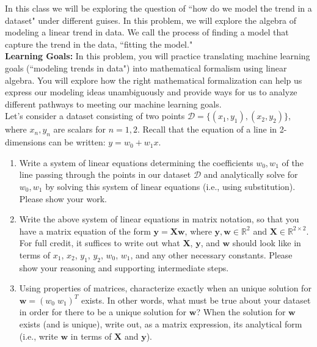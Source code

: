 \documentclass{harvardml}
\theoremstyle{definition}
\theoremstyle{plain}
\begin{document}
\newpage
\begin{problem}
In this class we will be exploring the question of ``how do we model the trend in a dataset" under different guises. In this problem, we will explore the algebra of modeling a linear trend in data. We call the process of finding a model that capture the trend in the data, ``fitting the model."\\

\noindent \textbf{Learning Goals:} In this problem, you will practice translating machine learning goals (``modeling trends in data") into mathematical formalism using linear algebra. You will explore how the right mathematical formalization can help us express our modeling ideas unambiguously and provide ways for us to analyze different pathways to meeting our machine learning goals.\\

\noindent Let's consider a dataset consisting of two points $\mathcal{D} = \{(x_1, y_1), (x_2, y_2)\}$, where $x_n, y_n$ are scalars for $n=1, 2$. Recall that the equation of a line in 2-dimensions can be written: $y = w_0 + w_1x$. 
\begin{enumerate}
    \item Write a system of linear equations determining the coefficients $w_0, w_1$ of the line passing through the points in our dataset $\mathcal{D}$ and analytically solve for $w_0, w_1$ by solving this system of linear equations (i.e., using substitution). Please show your work.
    \item Write the above system of linear equations in matrix notation, so that you have a matrix equation of the form $\mathbf{y} = \mathbf{X}\mathbf{w}$, where $\mathbf{y}, \mathbf{w} \in \mathbb{R}^2$ and $\mathbf{X} \in \mathbb{R}^{2\times 2}$. For full credit, it suffices to write out what $\mathbf{X}$, $\mathbf{y}$, and $\mathbf{w}$ should look like in terms of $x_1$, $x_2$, $y_1$, $y_2$, $w_0$, $w_1$, and any other necessary constants. Please show your reasoning and supporting intermediate steps.
    \item Using properties of matrices, characterize exactly when an unique solution for  $\mathbf{w}=\left(w_0 \; w_1 \right)^{T}$ exists. In other words, what must be true about your dataset in order for there to be a unique solution for $\mathbf{w}$? When the solution for $\mathbf{w}$ exists (and is unique), write out, as a matrix expression, its analytical form (i.e., write $\mathbf{w}$ in terms of $\mathbf{X}$ and $\mathbf{y}$).
    

\end{enumerate}
\end{problem}
\end{document}
